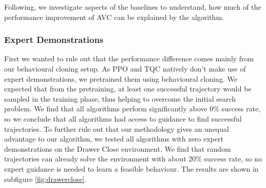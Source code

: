 Following, we investigate aspects of the baselines to understand, how much of the performance improvement of AVC can be explained by the algorithm. 

\subsubsection{Expert Demonstrations}
First we wanted to rule out that the performance difference comes mainly from our behavioural cloning setup. As PPO and TQC natively don't make use of expert demonstrations,
we pretrained them using behavioural cloning. We expected that from the pretraining, at least one successful trajectory would be sampled in the training phase, thus
helping to overcome the initial search problem. We find that all algorithms perform significantly above $0\%$ success rate, so we conclude that all algorithms had
access to guidance to find successful trajectories. To further rule out that our methodology gives an unequal advantage to our algorithm, we tested all algorithms with 
zero expert demonstrations on the 
Drawer Close environment. We find that random trajectories can already solve the environment with about $20\%$ success rate, so no expert guidance is needed to learn a feasible behaviour.
The results are shown in subfigure \ref{fig:drawerclose}.\\ 

